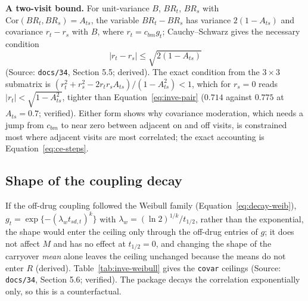 \documentclass[11pt]{article}
\newcommand{\code}[1]{\texttt{#1}}
\begin{document}
\textbf{A two-visit bound.} For unit-variance $B$, $BR_t$, $BR_s$ with
$\mathrm{Cor}(BR_t, BR_s) = A_{ts}$, the variable $BR_t - BR_s$ has
variance $2(1-A_{ts})$ and covariance $r_t - r_s$ with $B$, where
$r_t = c_{bm}g_t$; Cauchy--Schwarz gives the necessary condition
\begin{equation}
|r_t - r_s| \le \sqrt{2(1 - A_{ts})}
\label{eq:inve-pair}
\end{equation}
(Source: \code{docs/34}, Section 5.5; derived). The exact condition from
the $3\times3$ submatrix is
$(r_t^2 + r_s^2 - 2r_tr_sA_{ts})/(1 - A_{ts}^2) < 1$, which for
$r_s = 0$ reads $|r_t| < \sqrt{1 - A_{ts}^2}$, tighter than
Equation~\eqref{eq:inve-pair} ($0.714$ against $0.775$ at
$A_{ts} = 0.7$; verified). Either form shows why covariance moderation,
which needs a jump from $c_{bm}$ to near zero between adjacent on and
off visits, is constrained most where adjacent visits are most
correlated; the exact accounting is Equation~\eqref{eq:ce-steps}.

\subsection{Shape of the coupling decay}
\label{sec:inve-ce-shape}

If the off-drug coupling followed the Weibull family
(Equation~\eqref{eq:decay-weib}),
$g_t = \exp\{-(\lambda_w t_{sd,t})^k\}$ with
$\lambda_w = (\ln 2)^{1/k}/t_{1/2}$, rather than the exponential, the
shape would enter the ceiling only through the off-drug entries of
$g$; it does not affect $M$ and has no effect at $t_{1/2} = 0$, and
changing the shape of the carryover \emph{mean} alone leaves the
ceiling unchanged because the means do not enter $R$ (derived).
Table~\ref{tab:inve-weibull} gives the \code{covar} ceilings (Source:
\code{docs/34}, Section 5.6; verified). The package decays the
correlation exponentially only, so this is a counterfactual.
\end{document}
